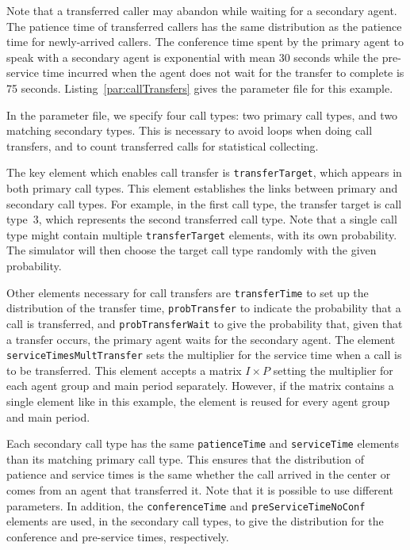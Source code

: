 Note that a transferred caller may abandon while waiting for a
secondary agent.
The patience time of transferred callers has the same distribution as
the patience time for newly-arrived callers.
The conference time spent by the primary agent to speak with a
secondary agent is exponential with mean 30 seconds while the
pre-service time incurred when the agent does not wait for the
transfer to complete is 75 seconds.
Listing~\ref{par:callTransfers} gives the parameter file for this
example.



In the parameter file, we specify four call types: two primary call
types, and two matching secondary types.
This is necessary to avoid loops when doing call transfers, and to
count transferred calls for statistical collecting.

The key element which enables call transfer is
\texttt{transfer\-Target}, which appears in both primary call types.
This element establishes the links between primary and secondary
call types.  For example, in the first call type, the transfer target
is call type~3, which represents the second transferred call type.
Note that a single call type might contain multiple
\texttt{transfer\-Target} elements, with its own probability. The
simulator will then choose the target call type randomly with the
given probability.

Other elements necessary for call transfers are
\texttt{transfer\-Time} to set up the distribution of the transfer
time, \texttt{prob\-Transfer} to indicate the probability that a call
is transferred, and \texttt{prob\-Transfer\-Wait} to give the
probability that, given that a transfer occurs, the primary agent waits for
the secondary agent.
The element \texttt{service\-Times\-Mult\-Transfer}
sets the multiplier for the service time when a call is to be
transferred.
This element accepts a matrix $I\times P$ setting the
multiplier for each agent group and
main period separately. However, if the matrix contains a single
element like in this example, the element is reused for every agent
group and main period.

Each secondary call type has the same \texttt{patience\-Time} and
\texttt{service\-Time} elements than its matching primary call type.
This ensures that the distribution of patience and service times is
the same whether the call arrived in the center or comes from an agent
that transferred it.
Note that it is possible to use different parameters.
In addition, the \texttt{conference\-Time} and
\texttt{pre\-Service\-Time\-No\-Conf} elements are used, in the
secondary call types, to give the distribution for the conference and
pre-service times, respectively.

